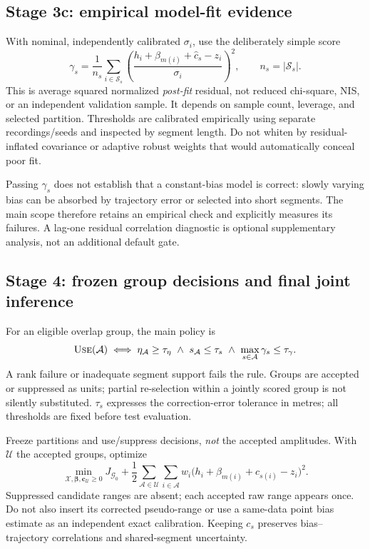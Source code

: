 \documentclass[conference]{IEEEtran}%
\newcommand{\X}{\mathcal X}
\newcommand{\A}{\mathcal A}
\newcommand{\Sg}{\mathcal S}
\begin{document}
\subsection{Stage 3c: empirical model-fit evidence}
With nominal, independently calibrated $\sigma_i$, use the deliberately simple score
\begin{equation}
 \gamma_s=\frac{1}{n_s}\sum_{i\in\Sg_s}
       \left(\frac{h_i+\beta_{m(i)}+\hat c_s-z_i}{\sigma_i}\right)^2,
 \qquad n_s=|\Sg_s|.
 \label{eq:gamma}
\end{equation}
This is average squared normalized \emph{post-fit} residual, not reduced chi-square, NIS, or an independent validation sample. It depends on sample count, leverage, and selected partition. Thresholds are calibrated empirically using separate recordings/seeds and inspected by segment length. Do not whiten by residual-inflated covariance or adaptive robust weights that would automatically conceal poor fit.

Passing $\gamma_s$ does not establish that a constant-bias model is correct: slowly varying bias can be absorbed by trajectory error or selected into short segments. The main scope therefore retains an empirical check and explicitly measures its failures. A lag-one residual correlation diagnostic is optional supplementary analysis, not an additional default gate.

\subsection{Stage 4: frozen group decisions and final joint inference}
For an eligible overlap group, the main policy is
\begin{equation}
 \textsc{Use}(\A)\iff
 \eta_\A\geq\tau_\eta\ \land\ s_\A\leq\tau_s\
 \land\ \max_{s\in\A}\gamma_s\leq\tau_\gamma.
 \label{eq:policy}
\end{equation}
A rank failure or inadequate segment support fails the rule. Groups are accepted or suppressed as units; partial re-selection within a jointly scored group is not silently substituted. $\tau_s$ expresses the correction-error tolerance in metres; all thresholds are fixed before test evaluation.

Freeze partitions and use/suppress decisions, \emph{not} the accepted amplitudes. With $\mathcal U$ the accepted groups, optimize
\begin{equation}
 \min_{\X,\bm\beta,\mathbf c_{\mathcal U}\geq0}
 J_{\mathcal G_0}+\frac12\sum_{\A\in\mathcal U}\sum_{i\in\A}
 w_i\big(h_i+\beta_{m(i)}+c_{s(i)}-z_i\big)^2.
 \label{eq:final}
\end{equation}
Suppressed candidate ranges are absent; each accepted raw range appears once. Do not also insert its corrected pseudo-range or use a same-data point bias estimate as an independent exact calibration. Keeping $c_s$ preserves bias--trajectory correlations and shared-segment uncertainty.
\end{document}
